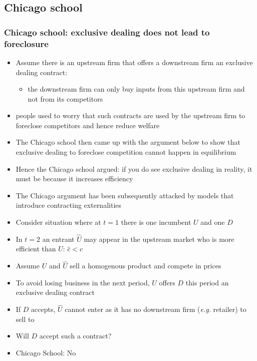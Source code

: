 \documentclass[11pt,english]{beamer}
\newcommand{\eg}{{\it e.g. }}
\newcommand{\Uh}{\hat{U}}
\newcommand{\ch}{\hat{c}}
\begin{document}
\subsection{Chicago school}

\begin{frame}[allowframebreaks]\frametitle{Chicago school:
    exclusive dealing does not lead to foreclosure}
  \begin{itemize}
  \item Assume there is an upstream firm that offers a downstream
    firm an exclusive dealing contract:
    \begin{itemize}
    \item the downstream firm can only buy inputs from this upstream
      firm and not from its competitors
    \end{itemize}
  \item people used to worry that such contracts are used by the
    upstream firm to foreclose competitors and hence reduce welfare
  \item The Chicago school then came up with the argument below to
    show that exclusive dealing to foreclose competition cannot happen
    in equilibrium
  \item Hence the Chicago school argued: if you do see exclusive
    dealing in reality, it must be because it increases efficiency
  \item The Chicago argument has been subsequently attacked by models
    that introduce contracting externalities
  \item Consider situation where at $t=1$ there is one incumbent $U$
    and one $D$
  \item In $t=2$ an entrant $\Uh$ may appear in the upstream market
    who is more efficient than $U$: $\ch <c$
  \item Assume $U$ and $\Uh$ sell a homogenous product and compete in
    prices
  \item To avoid losing business in the next period, $U$ offers $D$
    this period an exclusive dealing contract
  \item If $D$ accepts, $\Uh$ cannot enter as it has no downstream
    firm (\eg retailer) to sell to
  \item Will $D$ accept such a contract?
  \item Chicago School: No
  \end{itemize}
\end{frame}
\end{document}
